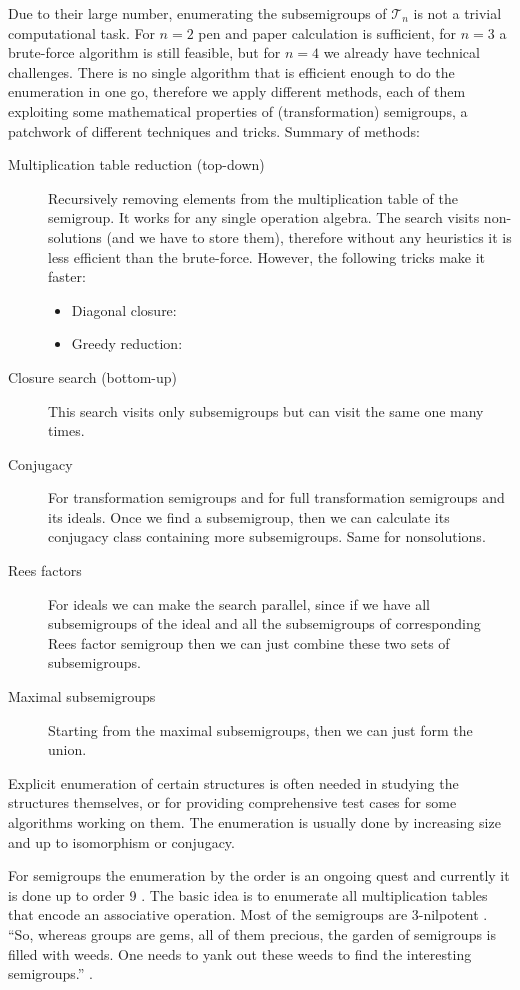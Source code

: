 \documentclass{amsart}
\newcommand{\cT}{{\mathcal T}}
\theoremstyle{plain}
\theoremstyle{definition}
\begin{document}
Due to their large number, enumerating the subsemigroups of $\cT_n$ is not a trivial computational task.
For $n=2$ pen and paper calculation is sufficient, for $n=3$ a brute-force algorithm is still feasible, but for $n=4$ we already have technical challenges.
There is no single algorithm that is efficient enough to do the enumeration in one go, therefore we apply different methods, each of them exploiting some mathematical properties of (transformation) semigroups, a patchwork of different techniques and tricks. 
Summary of methods:
\begin{description}
\item[Multiplication table reduction (top-down)] Recursively removing elements from the multiplication table of the semigroup.
It works for any single operation algebra.
The search visits non-solutions (and we have to store them), therefore without any heuristics it is less efficient than the brute-force. However, the following tricks make it faster:
\begin{itemize}
\item Diagonal closure:
\item Greedy reduction:
\end{itemize}

\item[Closure search (bottom-up)] This search visits only subsemigroups but can visit the same one many times.
\item[Conjugacy] For transformation semigroups and for full transformation semigroups and its ideals. Once we find a subsemigroup, then we can calculate its conjugacy class containing more subsemigroups. Same for nonsolutions.
\item[Rees factors] For ideals we can make the search parallel, since if we have all subsemigroups of the ideal and all the subsemigroups of corresponding Rees factor semigroup then we can just combine these two sets of subsemigroups. 
\item[Maximal subsemigroups] Starting from the maximal subsemigroups, then we can just form the union.

\end{description}



Explicit enumeration of certain structures is often needed in studying the structures themselves, or for providing comprehensive test cases for some algorithms working on them.
The enumeration is usually done by increasing size and up to isomorphism or conjugacy. 

For semigroups the enumeration by the order is an ongoing quest and currently it is done up to order 9 \cite{smallsemi,NumOf3NilPotentSgps2012,monoidenum2009,ord10semigroups}. The basic idea is to enumerate all multiplication tables that encode an associative operation. %
Most of the semigroups are 3-nilpotent \cite{smallsemi}. ``So, whereas groups are
gems, all of them precious, the garden of semigroups is filled with weeds. One
needs to yank out these weeds to find the interesting semigroups.'' \cite{QBook}.
\end{document}
